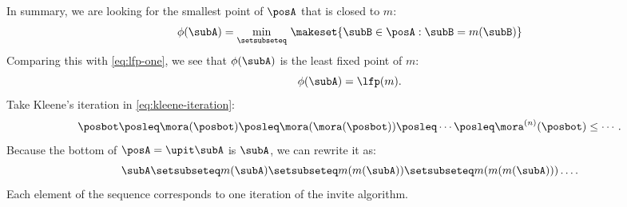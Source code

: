 In summary, we are looking for the smallest point of $\posA$ that is closed to $m$:
%
\begin{equation}
    \phi(\subA) = \min_{\setsubseteq}\, \makeset{ \subB \in \posA : \subB = m(\subB) }
\end{equation}
Comparing this with \cref{eq:lfp-one}, we see that $ \phi(\subA)$ is the least fixed point of $m$:
\begin{equation}
    \phi(\subA) = \lfp(m).
\end{equation}
%
Take Kleene's iteration in \cref{eq:kleene-iteration}:
\begin{equation}
    \posbot\posleq \mora(\posbot)\posleq \mora(\mora(\posbot))\posleq\cdots\posleq \mora^{(n)}(\posbot)\leq\cdots.
\end{equation}
Because the bottom of $\posA = \upit \subA$ is $\subA$, we can rewrite it as:
\begin{equation}
    \subA \setsubseteq  m(\subA ) \setsubseteq m(m(\subA)) \setsubseteq m(m(m(\subA))) \dots .
\end{equation}
Each element of the sequence corresponds to one iteration of the invite algorithm.
